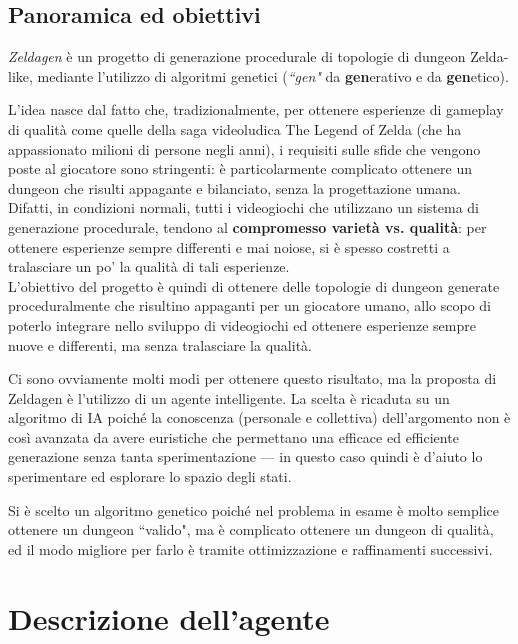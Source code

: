 \documentclass[12pt,titlepage]{article}
\begin{document}
\subsection {Panoramica ed obiettivi}
\textit{Zeldagen} è un progetto di generazione procedurale di topologie di dungeon Zelda-like, mediante l'utilizzo di algoritmi genetici (\textit{``gen"} da \textbf{gen}erativo e da \textbf{gen}etico).

\noindent L'idea nasce dal fatto che, tradizionalmente, per ottenere esperienze di gameplay di qualità come quelle della saga videoludica The Legend of Zelda (che ha appassionato milioni di persone negli anni), i requisiti sulle sfide che vengono poste al giocatore sono stringenti: è particolarmente complicato ottenere un dungeon che risulti appagante e bilanciato, senza la progettazione umana.\\

\noindent Difatti, in condizioni normali, tutti i videogiochi che utilizzano un sistema di generazione procedurale, tendono al \textbf{compromesso varietà vs. qualità}: per ottenere esperienze sempre differenti e mai noiose, si è spesso costretti a tralasciare un po' la qualità di tali esperienze.\\

\noindent L'obiettivo del progetto è quindi di ottenere delle topologie di dungeon generate proceduralmente che risultino appaganti per un giocatore umano, allo scopo di poterlo integrare nello sviluppo di videogiochi ed ottenere esperienze sempre nuove e differenti, ma senza tralasciare la qualità.

Ci sono ovviamente molti modi per ottenere questo risultato, ma la proposta di Zeldagen è l'utilizzo di un agente intelligente. La scelta è ricaduta su un algoritmo di IA poiché la conoscenza (personale e collettiva) dell'argomento non è così avanzata da avere euristiche che permettano una efficace ed efficiente generazione senza tanta sperimentazione --- in questo caso quindi è d'aiuto lo sperimentare ed esplorare lo spazio degli stati.

Si è scelto un algoritmo genetico poiché nel problema in esame è molto semplice ottenere un dungeon ``valido", ma è complicato ottenere un dungeon di qualità, ed il modo migliore per farlo è tramite ottimizzazione e raffinamenti successivi.

\section{Descrizione dell'agente}
\end{document}
